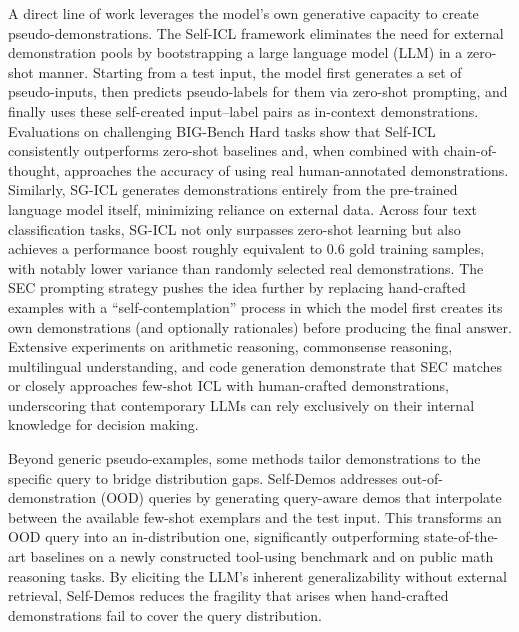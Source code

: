 \documentclass[11pt]{article}
\begin{document}
A direct line of work leverages the model's own generative capacity to create pseudo-demonstrations. The Self-ICL framework \cite{ref94} eliminates the need for external demonstration pools by bootstrapping a large language model (LLM) in a zero-shot manner. Starting from a test input, the model first generates a set of pseudo-inputs, then predicts pseudo-labels for them via zero-shot prompting, and finally uses these self-created input--label pairs as in-context demonstrations. Evaluations on challenging BIG-Bench Hard tasks show that Self-ICL consistently outperforms zero-shot baselines and, when combined with chain-of-thought, approaches the accuracy of using real human-annotated demonstrations. Similarly, SG-ICL \cite{ref95} generates demonstrations entirely from the pre-trained language model itself, minimizing reliance on external data. Across four text classification tasks, SG-ICL not only surpasses zero-shot learning but also achieves a performance boost roughly equivalent to 0.6 gold training samples, with notably lower variance than randomly selected real demonstrations. The SEC prompting strategy \cite{ref96} pushes the idea further by replacing hand-crafted examples with a ``self-contemplation'' process in which the model first creates its own demonstrations (and optionally rationales) before producing the final answer. Extensive experiments on arithmetic reasoning, commonsense reasoning, multilingual understanding, and code generation demonstrate that SEC matches or closely approaches few-shot ICL with human-crafted demonstrations, underscoring that contemporary LLMs can rely exclusively on their internal knowledge for decision making.

Beyond generic pseudo-examples, some methods tailor demonstrations to the specific query to bridge distribution gaps. Self-Demos \cite{ref97} addresses out-of-demonstration (OOD) queries by generating query-aware demos that interpolate between the available few-shot exemplars and the test input. This transforms an OOD query into an in-distribution one, significantly outperforming state-of-the-art baselines on a newly constructed tool-using benchmark and on public math reasoning tasks. By eliciting the LLM's inherent generalizability without external retrieval, Self-Demos reduces the fragility that arises when hand-crafted demonstrations fail to cover the query distribution.
\end{document}
